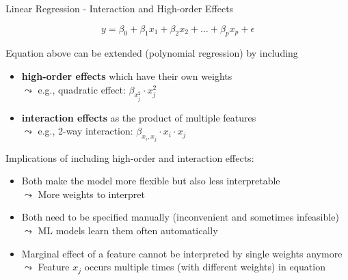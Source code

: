 \documentclass[11pt,compress,t,notes=noshow, aspectratio=169, xcolor=table]{beamer}
\begin{document}
\begin{frame}{Linear Regression - Interaction and High-order Effects}

$$y = \beta_0 + \beta_1 x_1 + \beta_2 x_2 + \dots + \beta_p x_p + \epsilon$$

Equation above can be extended (polynomial regression) by including

\begin{itemize}
\item \textbf{high-order effects} which have their own weights\\
$\leadsto$ e.g., quadratic effect: $\beta_{x_j^2} \cdot x_j^2$
\item \textbf{interaction effects} as the product of multiple features\\
$\leadsto$ e.g., 2-way interaction: $\beta_{x_i, x_j} \cdot x_i \cdot x_j$
\end{itemize}
\pause
Implications of including high-order and interaction effects: 
\begin{itemize}
    \item Both make the model more flexible but also less interpretable\\
    $\leadsto$ More weights to interpret
    \item Both need to be specified manually (inconvenient and sometimes infeasible)\\
    $\leadsto$ ML models learn them often automatically
    \item Marginal effect of a feature cannot be interpreted by single weights anymore\\
$\leadsto$ Feature $x_j$ occurs multiple times (with different weights) in equation
\end{itemize}


\end{frame}


\end{document}
